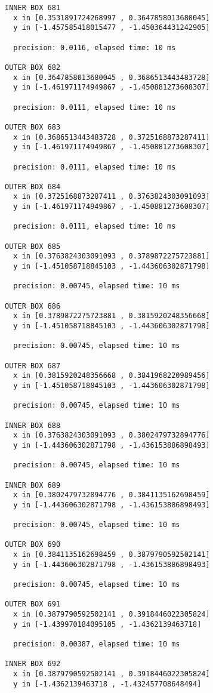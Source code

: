 \begin{verbatim}
INNER BOX 681
  x in [0.3531891724268997 , 0.3647858013680045]
  y in [-1.457585418015477 , -1.450364431242905]

  precision: 0.0116, elapsed time: 10 ms

OUTER BOX 682
  x in [0.3647858013680045 , 0.3686513443483728]
  y in [-1.461971174949867 , -1.450881273608307]

  precision: 0.0111, elapsed time: 10 ms

OUTER BOX 683
  x in [0.3686513443483728 , 0.3725168873287411]
  y in [-1.461971174949867 , -1.450881273608307]

  precision: 0.0111, elapsed time: 10 ms

OUTER BOX 684
  x in [0.3725168873287411 , 0.3763824303091093]
  y in [-1.461971174949867 , -1.450881273608307]

  precision: 0.0111, elapsed time: 10 ms

OUTER BOX 685
  x in [0.3763824303091093 , 0.3789872275723881]
  y in [-1.451058718845103 , -1.443606302871798]

  precision: 0.00745, elapsed time: 10 ms

OUTER BOX 686
  x in [0.3789872275723881 , 0.3815920248356668]
  y in [-1.451058718845103 , -1.443606302871798]

  precision: 0.00745, elapsed time: 10 ms

OUTER BOX 687
  x in [0.3815920248356668 , 0.3841968220989456]
  y in [-1.451058718845103 , -1.443606302871798]

  precision: 0.00745, elapsed time: 10 ms

INNER BOX 688
  x in [0.3763824303091093 , 0.3802479732894776]
  y in [-1.443606302871798 , -1.436153886898493]

  precision: 0.00745, elapsed time: 10 ms

INNER BOX 689
  x in [0.3802479732894776 , 0.3841135162698459]
  y in [-1.443606302871798 , -1.436153886898493]

  precision: 0.00745, elapsed time: 10 ms

OUTER BOX 690
  x in [0.3841135162698459 , 0.3879790592502141]
  y in [-1.443606302871798 , -1.436153886898493]

  precision: 0.00745, elapsed time: 10 ms

OUTER BOX 691
  x in [0.3879790592502141 , 0.3918446022305824]
  y in [-1.439970184095105 , -1.4362139463718]

  precision: 0.00387, elapsed time: 10 ms

INNER BOX 692
  x in [0.3879790592502141 , 0.3918446022305824]
  y in [-1.4362139463718 , -1.432457708648494]


\end{verbatim}
